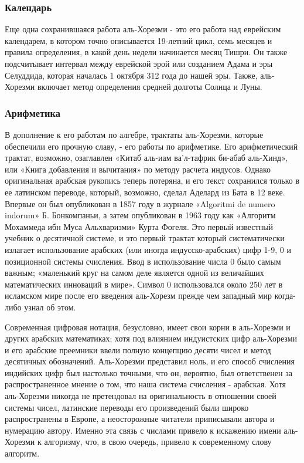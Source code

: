 \subsubsection{Календарь}
Еще одна сохранившаяся работа аль-Хорезми - это его работа над еврейским календарем, в котором точно описывается 19-летний цикл, семь месяцев и правила определения, в какой день недели начинается месяц Тишри. Он также подсчитывает интервал между еврейской эрой или созданием Адама и эры Селуддида, которая началась 1 октября 312 года до нашей эры. Также, аль-Хорезми включает метод определения средней долготы Солнца и Луны.


\subsubsection{Арифметика}
В дополнение к его работам по алгебре, трактаты аль-Хорезми, которые обеспечили его прочную славу, - его работы по арифметике. Его арифметический трактат, возможно, озаглавлен «Китаб аль-иам ва'л-тафрик би-абаб аль-Хинд», или «Книга добавления и вычитания» по методу расчета индусов. Однако оригинальная арабская рукопись теперь потеряна, и его текст сохранился только в ее латинском переводе, который, возможно, сделал Аделард из Бата в 12 веке. Впервые он был опубликован в 1857 году в журнале «Algoritmi de numero indorum» Б. Бонкомпаньи, а затем опубликован в 1963 году как «Алгоритм Мохаммеда ибн Муса Альхваризми» Курта Фогеля. Это первый известный учебник о десятичной системе, и это первый трактат который систематически излагает использование арабских (или иногда индусско-арабских) цифр 1-9, 0 и позиционной системы счисления.\cite{mohamed} Ввод в использование числа 0 было самым важным; «маленький круг на самом деле является одной из величайших математических инноваций в мире».\cite{mohamed} Символ 0 использовался около 250 лет в исламском мире после его введения аль-Хорезм прежде чем западный мир когда-либо узнал об этом.

Современная цифровая нотация, безусловно, имеет свои корни в аль-Хорезми и других арабских математиках; хотя под влиянием индуистских цифр аль-Хорезми и его арабские преемники ввели полную концепцию десяти чисел и метод десятичных обозначений\cite{mohamed}. Аль-Хорезми представил ноль, и его способ счисления индийских цифр был настолько точными, что он, вероятно, был ответственен за распространенное мнение о том, что наша система счисления - арабская. Хотя аль-Хорезми никогда не претендовал на оригинальность в отношении своей системы чисел, латинские переводы его произведений были широко распространены в Европе, а неосторожные читатели приписывали автора и нумерацию автору\cite{boyer}. Именно эта связь с числами привело к искажению имени аль-Хорезми к алгоризму, что, в свою очередь, привело к современному слову алгоритм.


